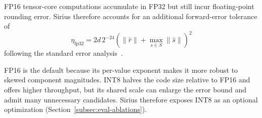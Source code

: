 FP16 tensor-core computations accumulate in FP32 but still incur
floating-point rounding error. Sirius therefore accounts for an
additional forward-error tolerance of
\[
    \eta_{\mathrm{fp32}} =
    2d\,2^{-24}
    \left(\|\hat{r}\|+\max_{s\in S}\|\hat{s}\|\right)^2
\]
following the standard error analysis~\cite{Higham02}.


FP16 is the default because its per-value exponent makes it more robust
to skewed component magnitudes. INT8 halves the code size relative to
FP16 and offers higher throughput, but its shared scale can enlarge
the error bound and admit many unnecessary candidates. Sirius therefore
exposes INT8 as an optional optimization
(Section~\ref{subsec:eval-ablations}).
